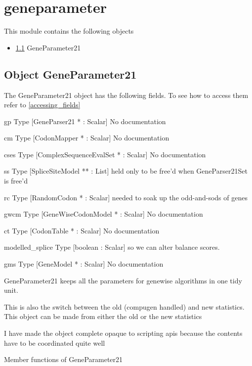 \section{geneparameter}
\label{module_geneparameter}
This module contains the following objects

\begin{itemize}
\item \ref{object_GeneParameter21} GeneParameter21

\end{itemize}
\subsection{Object GeneParameter21}

\label{object_GeneParameter21}

The GeneParameter21 object has the following fields. To see how to access them refer to \ref{accessing_fields}
\begin{description}
\item{gp} Type [GeneParser21 * : Scalar] No documentation

\item{cm} Type [CodonMapper  * : Scalar] No documentation

\item{cses} Type [ComplexSequenceEvalSet * : Scalar] No documentation

\item{ss} Type [SpliceSiteModel ** : List]  held only to be free'd when GeneParser21Set is free'd

\item{rc} Type [RandomCodon  * : Scalar]  needed to soak up the odd-and-sods of genes

\item{gwcm} Type [GeneWiseCodonModel * : Scalar] No documentation

\item{ct} Type [CodonTable   * : Scalar] No documentation

\item{modelled_splice} Type [boolean : Scalar]  so we can alter balance scores.

\item{gms} Type [GeneModel    * : Scalar] No documentation

\end{description}


GeneParameter21 keeps all the parameters
for genewise algorithms in one tidy unit.


This is also the switch between the old (compugen handled)
and new statistics. This object can be made from
either the old or the new statistics


I have made the object complete opaque to 
scripting apis because the contents have to
be coordinated quite well




Member functions of GeneParameter21

